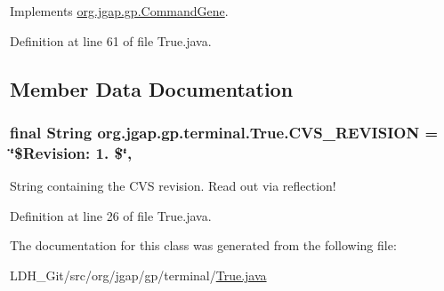 Implements \hyperlink{classorg_1_1jgap_1_1gp_1_1_command_gene_a236141d99059da808afe7a9217e411c7}{org.\-jgap.\-gp.\-Command\-Gene}.



Definition at line 61 of file True.\-java.



\subsection{Member Data Documentation}
\hypertarget{classorg_1_1jgap_1_1gp_1_1terminal_1_1_true_ab3e972626bc4bcff94545eb64f030034}{
\subsubsection[{C\-V\-S\-\_\-\-R\-E\-V\-I\-S\-I\-O\-N}]{\setlength{\rightskip}{0pt plus 5cm}final String org.\-jgap.\-gp.\-terminal.\-True.\-C\-V\-S\-\_\-\-R\-E\-V\-I\-S\-I\-O\-N = \char`\"{}\$Revision\-: 1. \$\char`\"{}\hspace{0.3cm}{\ttfamily [static]}, {\ttfamily [private]}}}\label{classorg_1_1jgap_1_1gp_1_1terminal_1_1_true_ab3e972626bc4bcff94545eb64f030034}
String containing the C\-V\-S revision. Read out via reflection! 

Definition at line 26 of file True.\-java.



The documentation for this class was generated from the following file\-:\begin{DoxyCompactItemize}
\item 
L\-D\-H\-\_\-\-Git/src/org/jgap/gp/terminal/\hyperlink{_true_8java}{True.\-java}\end{DoxyCompactItemize}
